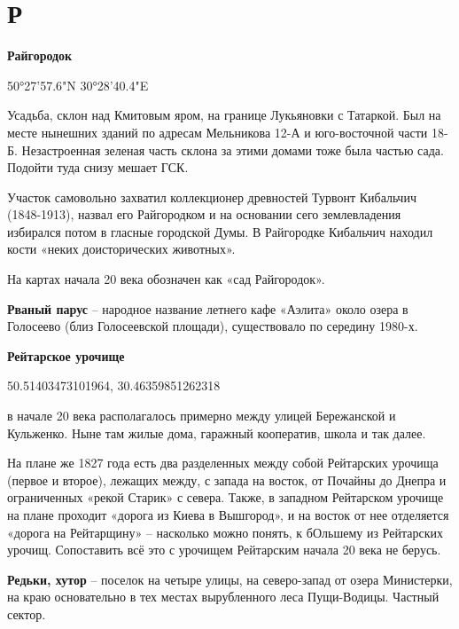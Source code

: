 \chapter*{Р}

\textbf{Райгородок}

50°27'57.6"N 30°28'40.4"E

Усадьба, склон над Кмитовым яром, на границе Лукьяновки с Татаркой. Был на месте нынешних зданий по адресам Мельникова 12-А и юго-восточной части 18-Б. Незастроенная зеленая часть склона за этими домами тоже была частью сада. Подойти туда снизу мешает ГСК.

Участок самовольно захватил коллекционер древностей Турвонт Кибальчич (1848-1913), назвал его Райгородком и на основании сего землевладения избирался потом в гласные городской Думы. В Райгородке Кибальчич находил кости «неких доисторических животных».

На картах начала 20 века обозначен как «сад Райгородок».\\

\medskip

\textbf{Рваный парус} – народное название летнего кафе «Аэлита» около озера в Голосеево (близ Голосеевской площади), существовало по середину 1980-х.\\

\medskip

\textbf{Рейтарское урочище} 

50.51403473101964, 30.46359851262318

в начале 20 века располагалось примерно между улицей Бережанской и Кульженко. Ныне там жилые дома, гаражный кооператив, школа и так далее.

На плане же 1827 года есть два разделенных между собой Рейтарских урочища (первое и второе), лежащих между, с запада на восток, от Почайны до Днепра и ограниченных «рекой Старик» с севера. Также, в западном Рейтарском урочище на плане проходит «дорога из Киева в Вышгород», и на восток от нее отделяется «дорога на Рейтарщину» – насколько можно понять, к бОльшему из Рейтарских урочищ. Сопоставить всё это с урочищем Рейтарским начала 20 века не берусь.\\

\medskip


\textbf{Редьки, хутор} – поселок на четыре улицы, на северо-запад от озера Министерки, на краю основательно в тех местах вырубленного леса Пущи-Водицы. Частный сектор.\\

